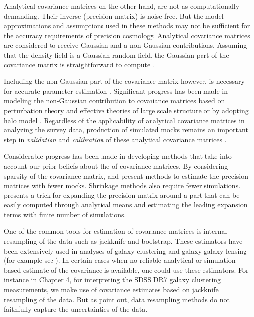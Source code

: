 Analytical covariance matrices on the other hand, are not as computationally demanding. 
Their inverse (precision matrix) is noise free. But the model approximations and assumptions used in these methods may not be sufficient for the accuracy requirements of precision cosmology. Analytical covariance matrices are considered to receive Gaussian and a non-Gaussian contributions. Assuming that the density field is a 
Gaussian random field, the Gaussian part of the covariance matrix is straightforward to compute \citep{grieb2016,klaus2016,slepian2016b}.

Including the non-Gaussian part of the covariance matrix however, is necessary for accurate parameter estimation \citep{takahashi2011,blot2016,chan2016}.
Significant progress has been made in modeling the non-Gaussian contribution to covariance matrices based on perturbation theory and effective theories of large scale structure \citep{mohammed_seljak,mohammed2017} or by adopting halo model \citep{takada_spergel,eifler2014}.
Regardless of the applicability of analytical covariance matrices in analyzing the survey data, production of simulated mocks remains an important step in \emph{validation} and \emph{calibration} of these analytical covariance matrices \citep{slepian2016b,hildebrandt2017}.

Considerable progress has been made in developing methods that take into account our prior beliefs 
about the of covariance matrices. By considering sparsity of the covariance matrix, \citet{paz2015} and \citet{padmanabhan2016} 
present methods to estimate the precision matrices with fewer mocks. Shrinkage methods \citep{pope2008,joachimi2016} 
also require fewer simulations. \citet{fried2017} presents a trick for expanding the precision matrix 
around a part that can be easily computed through analytical means and estimating the leading expansion terms with finite number of simulations.

One of the common tools for estimation of covariance matrices is internal resampling of the data such as jackknife and bootstrap. These estimators have been extensively used in analyses of galaxy clustering and galaxy-galaxy lensing (for example see \citealt{reid2014,hod_vs_sham,shirasaki2016,singh2016,kwan2017}).
In certain cases when no reliable analytical or simulation-based estimate of the covariance is available, one could use these estimators. 
For instance in Chapter 4, for interpreting the SDSS DR7 galaxy clustering measurements, 
we make use of covariance estimates based on jackknife resampling of the data. But as \citet{norberg,fried2016} point out, data resampling methods do not faithfully capture the uncertainties of the data. 

